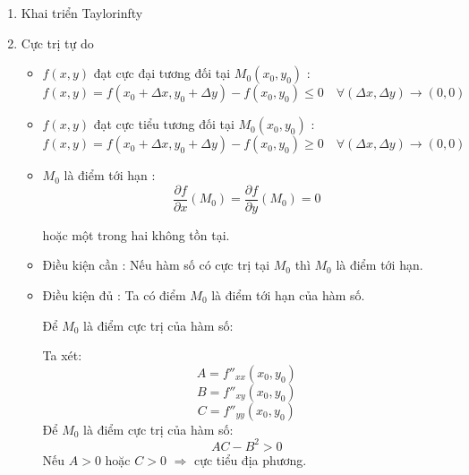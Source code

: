 \documentclass[12pt,a4paper]{report}
\begin{document}
{\begin{center}
\begin{enumerate}
            Ta có:
            \[\nabla f(x_{0}, y_{0}) = f'_{x}(x_{0}, y_{0}).\overrightarrow{i} + f'_{y}(x_{0}, y_{0}).\overrightarrow{j}\]
            \[\overrightarrow{grad}f(x_{0}, y_{0}) = (f'_{x}(x_{0}, y_{0}), f'_{y}(x_{0}, y_{0}))\]
        \item Khai triển Taylorinfty
       
            
   		\item Cực trị tự do
            \begin{itemize}
                \item $f(x, y)$ đạt cực đại tương đối tại $M_{0}(x_{0}, y_{0})$ :  
                    \[f(x, y) = f(x_{0} + \Delta x, y_{0} + \Delta y) - f(x_{0}, y_{0}) \leqslant 0 \quad \forall (\Delta x, \Delta y) \to (0, 0)
                    \] 
                \item  $f(x, y)$ đạt cực tiểu tương đối tại $M_{0}(x_{0}, y_{0})$ :  
                \[f(x, y) = f(x_{0} + \Delta x, y_{0} + \Delta y) - f(x_{0}, y_{0}) \geqslant  0 \quad \forall (\Delta x, \Delta y) \to (0, 0)
                \] 
                \item $M_{0}$ là điểm tới hạn :
                    \[\dfrac{\partial f}{\partial x}(M_{0}) = \dfrac{\partial f}{\partial y}(M_{0}) = 0\]

                    hoặc một trong hai không tồn tại.
                \item Điều kiện cần :
                    Nếu hàm số có cực trị tại $M_{0}$ thì $M_{0}$ là điểm tới hạn.
                \item Điều kiện đủ :
                    Ta có điểm $M_{0}$ là điểm tới hạn của hàm số.

                    Để $M_{0}$ là điểm cực trị của hàm số:

                    Ta xét:
                        \[A = f''_{xx}(x_{0}, y_{0})\]
                        \[B = f''_{xy}(x_{0}, y_{0})\]
                        \[C = f''_{yy}(x_{0}, y_{0})\]
                    \indent Để $M_{0}$ là điểm cực trị của hàm số:
                        \[AC - B^{2} > 0\]
                    Nếu $A > 0$ hoặc $C > 0$ $\Rightarrow$ cực tiểu địa phương.


\end{itemize}
\end{enumerate}
\end{center}}
\end{document}
